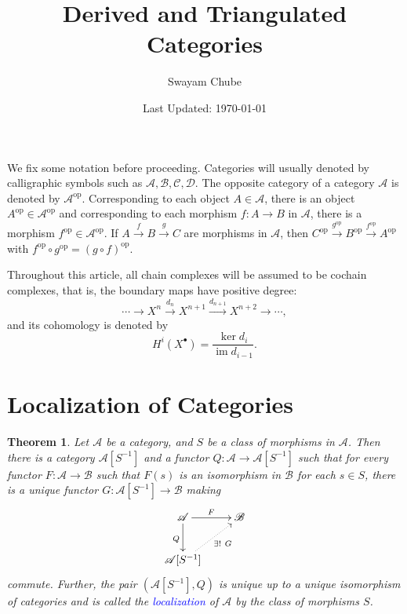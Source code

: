 \documentclass[11pt]{article}
\theoremstyle{thmstyle}
\newtheorem{theorem}{Theorem}[section]
\theoremstyle{defstyle}
\newcommand{\im}{\operatorname{im}}
\newcommand{\scrA}{\mathscr{A}}
\newcommand{\scrB}{\mathscr{B}}
\newcommand{\scrC}{\mathscr{C}}
\newcommand{\scrD}{\mathscr{D}}
\newcommand{\define}[1]{\textcolor{blue}{\textit{#1}}}
\newcommand{\op}{\mathrm{op}}
\begin{document}
\title{Derived and Triangulated Categories}
\author{Swayam Chube}
\date{Last Updated: \today}
\maketitle
\tableofcontents

\hrulefill 

We fix some notation before proceeding. Categories will usually denoted by calligraphic symbols such as $\scrA,\scrB,\scrC,\scrD$. The opposite category of a category $\scrA$ is denoted by $\scrA^{\op}$. Corresponding to each object $A\in\scrA$, there is an object $A^{\op}\in\scrA^{\op}$ and corresponding to each morphism $f\colon A\to B$ in $\scrA$, there is a morphism $f^{\op}\in\scrA^{\op}$. If $A\xrightarrow{f} B\xrightarrow{g} C$ are morphisms in $\scrA$, then $C^{\op}\xrightarrow{g^{\op}} B^{\op}\xrightarrow{f^{\op}} A^{\op}$ with $f^\op\circ g^\op = (g\circ f)^\op$. 

Throughout this article, all chain complexes will be assumed to be cochain complexes, that is, the boundary maps have positive degree: 
\begin{equation*}
	\cdots\to X^n\xrightarrow{d_n} X^{n + 1}\xrightarrow{d_{n + 1}} X^{n + 2}\to\cdots,
\end{equation*}
and its cohomology is denoted by 
\begin{equation*}
	H^i\left(X^\bullet\right) = \frac{\ker d_i}{\im d_{i - 1}}.
\end{equation*}

\section{Localization of Categories}
\begin{theorem}
	Let $\scrA$ be a category, and $S$ be a class of morphisms in $\scrA$. Then there is a category $\scrA[S^{-1}]$ and a functor $Q\colon\scrA\to\scrA[S^{-1}]$ such that for every functor $F\colon\scrA\to\scrB$ such that $F(s)$ is an isomorphism in $\scrB$ for each $s\in S$, there is a unique functor $G\colon\scrA[S^{-1}]\to\scrB$ making 
	\begin{equation*}
		\xymatrix {
			\scrA\ar[r]^F\ar[d]_Q & \scrB\\
			\scrA[S^{-1}]\ar@{.>}[ru]_-{\exists!~G}
		}
	\end{equation*}
	commute. Further, the pair $(\scrA[S^{-1}], Q)$ is unique up to a unique isomorphism of categories and is called the \define{localization} of $\scrA$ by the class of morphisms $S$.
\end{theorem}
\end{document}
